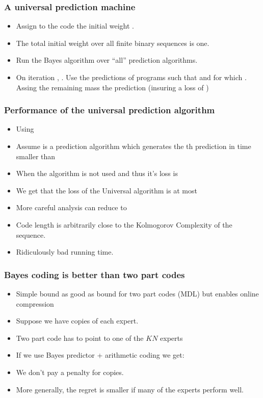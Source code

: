 \documentclass{beamer}
\begin{document}
\begin{frame}
\frametitle{A universal prediction machine}
\begin{itemize}
\item Assign to the code \R{$\vb$} the initial weight .
\item The total initial weight over all finite binary sequences is one.
\item Run the Bayes algorithm over ``all'' prediction algorithms.
\item {} On iteration , . 
Use the predictions of 
programs \R{$\vb$} such that  and for which . Assing the remaining mass the prediction  (insuring a loss of )
\end{itemize}
\end{frame}

\begin{frame}
\frametitle{Performance of the universal prediction algorithm}
\begin{itemize}
\item Using 
\item Assume  is a prediction algorithm which generates the 
th prediction in time smaller than 
\item When  the algorithm is not used and thus it's loss is 
\item We get that the loss of the Universal algorithm is at most 
\item More careful analysis can reduce  to 
\item Code length is arbitrarily close to the Kolmogorov Complexity of the sequence.
\item Ridiculously bad running time.
\end{itemize}
\end{frame}

\begin{frame}
\frametitle{Bayes coding is better than two part codes}
\begin{itemize}
\item
Simple bound as good as bound for two part codes (MDL) 
but enables online compression
\item Suppose we have  copies of each expert.
\item Two part code has to point to one of the $KN$ experts
\item If we use Bayes predictor + arithmetic coding we get:
\item We don't pay a penalty for copies.
\item More generally, the regret is smaller if many of the experts perform well.
\end{itemize}
\end{frame}
\end{document}

